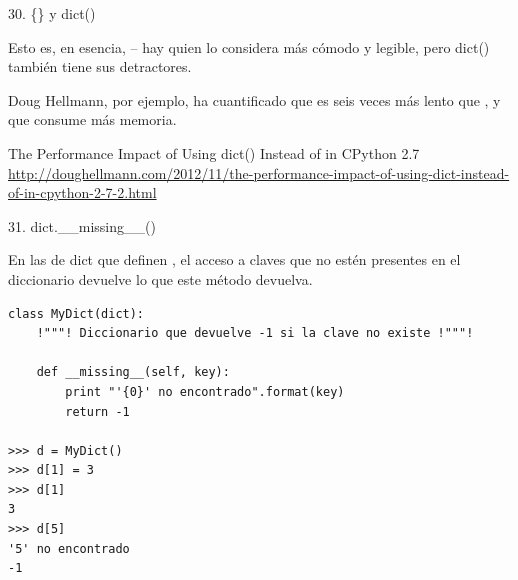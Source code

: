 \documentclass[14pt]{beamer}
\begin{document}
\begin{frame}[fragile]{30. \{\} y dict()}
  \begin{alertblock}{}
    \centering
    Esto es, en esencia,  -- hay
    quien lo considera más cómodo y legible, pero dict() también tiene
    sus detractores.
  \end{alertblock}

  \vspace{0.5cm}

  \footnotesize
  \begin{center}
    \centering
    Doug Hellmann, por ejemplo, ha cuantificado que es seis veces más
    lento que {}, y que consume más memoria.
  \end{center}

  \footnotesize
    \begin{block}
    {\centering The Performance Impact of Using dict() Instead of {} in CPython 2.7}
    \centering
    \url{http://doughellmann.com/2012/11/the-performance-impact-of-using-dict-instead-of-in-cpython-2-7-2.html}
  \end{block}
\end{frame}

\begin{frame}[fragile]{31. dict.\_\_missing\_\_()}
  \small
  \begin{block}{}
    \centering
    En las  de dict que definen
    , el acceso a claves que no estén
    presentes en el diccionario devuelve lo que este método devuelva.
  \end{block}

  \scriptsize
  \begin{exampleblock}{}
    \begin{lstlisting}[escapechar=!]
class MyDict(dict):
    !"""! Diccionario que devuelve -1 si la clave no existe !"""!

    def __missing__(self, key):
        print "'{0}' no encontrado".format(key)
        return -1

>>> d = MyDict()
>>> d[1] = 3
>>> d[1]
3
>>> d[5]
'5' no encontrado
-1
    \end{lstlisting}
  \end{exampleblock}
\end{frame}
\end{document}
